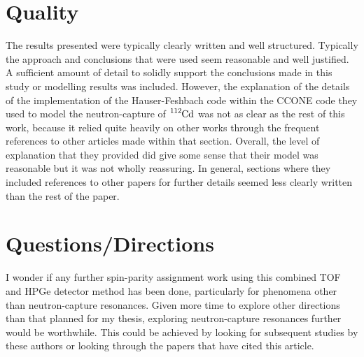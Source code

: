 \documentclass[12pt,a4paper]{article}
\begin{document}
\section*{Quality}

The results presented were typically clearly written and well structured. Typically the approach and conclusions that were used seem reasonable and well justified. A sufficient amount of detail to solidly support the conclusions made in this study or modelling results was included. However, the explanation of the details of the implementation of the Hauser-Feshbach code within the CCONE code they used to model the neutron-capture of $\ce{^{112}Cd}$ was not as clear as the rest of this work, because it relied quite heavily on other works through the frequent references to other articles made within that section. Overall, the level of explanation that they provided did give some sense that their model was reasonable but it was not wholly reassuring. In general, sections where they included references to other papers for further details seemed less clearly written than the rest of the paper.


\section*{Questions/Directions}

I wonder if any further spin-parity assignment work using this combined TOF and HPGe detector method has been done, particularly for phenomena other than neutron-capture resonances. Given more time to explore other directions than that planned for my thesis, exploring neutron-capture resonances further would be worthwhile. This could be achieved by looking for subsequent studies by these authors or looking through the papers that have cited this article.
\end{document}
